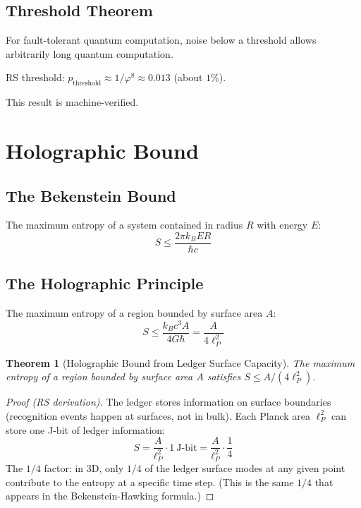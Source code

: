 \documentclass[12pt,a4paper]{article}
\newtheorem{theorem}{Theorem}[section]
\theoremstyle{definition}
\theoremstyle{remark}
\begin{document}
\subsection{Threshold Theorem}

For fault-tolerant quantum computation, noise below a threshold allows arbitrarily 
long quantum computation.

RS threshold: $p_\mathrm{threshold} \approx 1/\varphi^8 \approx 0.013$ (about $1\%$).

This result is machine-verified.

\section{Holographic Bound}

\subsection{The Bekenstein Bound}

The maximum entropy of a system contained in radius $R$ with energy $E$:
\begin{equation}
S \leq \frac{2\pi k_B E R}{\hbar c}
\end{equation}

\subsection{The Holographic Principle}

The maximum entropy of a region bounded by surface area $A$:
\begin{equation}
S \leq \frac{k_B c^3 A}{4 G \hbar} = \frac{A}{4\ell_P^2}
\end{equation}

\begin{theorem}[Holographic Bound from Ledger Surface Capacity]
The maximum entropy of a region bounded by surface area $A$ satisfies
$S \leq A/(4\ell_P^2)$.
\end{theorem}

\begin{proof}[Proof (RS derivation)]
The ledger stores information on surface boundaries 
(recognition events happen at surfaces, not in bulk). Each Planck area $\ell_P^2$ 
can store one J-bit of ledger information:
\begin{equation}
S = \frac{A}{\ell_P^2} \cdot 1~\text{J-bit} = \frac{A}{\ell_P^2} \cdot \frac{1}{4}
\end{equation}
The $1/4$ factor: in 3D, only $1/4$ of the ledger surface modes at any given point 
contribute to the entropy at a specific time step. (This is the same $1/4$ that 
appears in the Bekenstein-Hawking formula.)
\end{proof}
\end{document}
